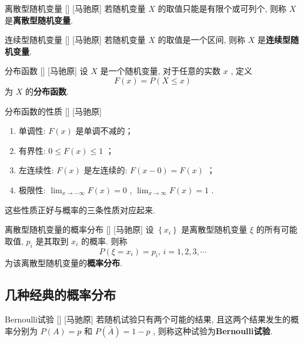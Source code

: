 \documentclass[UTF8]{ctexart}
\begin{document}
        \begin{dfn}
            []
            {离散型随机变量}
            []
            [马驰原]
            若随机变量 \(X\) 的取值只能是有限个或可列个, 则称 \(X\) 是\textbf{离散型随机变量}. 
        \end{dfn}

        \begin{dfn}
            []
            {连续型随机变量}
            []
            [马驰原]
            若随机变量 \(X\) 的取值是一个区间, 则称 \(X\) 是\textbf{连续型随机变量}. 
        \end{dfn}

        \begin{dfn}
            []
            {分布函数}
            []
            [马驰原]
            设 \(X\) 是一个随机变量, 对于任意的实数 \(x\) , 定义\[F(x)=P(X\leq x)\]为 \(X\) 的\textbf{分布函数}. 
        \end{dfn}

        \begin{ppt}
            []
            {分布函数的性质}
            []
            [马驰原]
            \begin{enumerate}
                \item 单调性:  \(F(x)\) 是单调不减的；
                \item 有界性:  \(0\leq F(x)\leq 1\) ；
                \item 左连续性:  \(F(x)\) 是左连续的:  \(F(x-0)=F(x)\) ；
                \item 极限性:  \(\lim_{x\to-\infty}F(x)=0\) ,  \(\lim_{x\to\infty}F(x)=1\) . 
            \end{enumerate}
        \end{ppt}

        这些性质正好与概率的三条性质对应起来. 

        \begin{dfn}
            []
            {离散型随机变量的概率分布}
            []
            [马驰原]
            设 \(\left\{x_i\right\} \) 是离散型随机变量 \(\xi\) 的所有可能取值,  \(p_i\) 是其取到 \(x_i\) 的概率. 则称
            \[P(\xi=x_i)=p_i,\,i=1,2,3,\cdots\]为该离散型随机变量的\textbf{概率分布}. 
        \end{dfn}

    \subsection{几种经典的概率分布}
        \begin{dfn}
            []
            {Bernoulli试验}
            []
            [马驰原]
            若随机试验只有两个可能的结果, 且这两个结果发生的概率分别为 \(P(A)=p\) 和 \(P(\bar{A})=1-p\) , 则称这种试验为\textbf{Bernoulli试验}. 
        \end{dfn}
\end{document}
